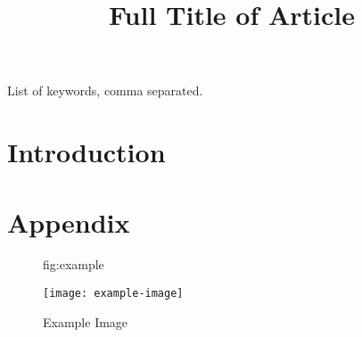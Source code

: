 \documentclass{midl}
\title[Short Title]{Full Title of Article}
\begin{document}
\maketitle

\begin{abstract}
\blindtext
\end{abstract}

\begin{keywords}
List of keywords, comma separated.
\end{keywords}

\section{Introduction}

\Blindtext[5][2]

\acks{\blindtext}

\appendix
\section{Appendix}

\begin{figure}[htbp]
\floatconts
  {fig:example}
  {\caption{Example Image}}
  {\texttt{[image: example-image]}}
\end{figure}
\end{document}
